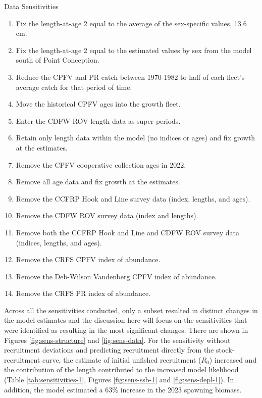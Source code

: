\documentclass[11pt,
  english,
  letterpaper,
]{article}
\begin{document}
Data Sensitivities

\begin{enumerate}

  \item Fix the length-at-age 2 equal to the average of the sex-specific values, 13.6 cm.
  
  \item Fix the length-at-age 2 equal to the estimated values by sex from the model south of Point Conception.
   
  \item Reduce the CPFV and PR catch between 1970-1982 to half of each fleet's average catch for that period of time.
  
  \item Move the historical CPFV ages into the growth fleet.
  
  \item Enter the CDFW ROV length data as super periods.
  
  \item Retain only length data within the model (no indices or ages) and fix growth at the estimates.
  
  \item Remove the CPFV cooperative collection ages in 2022.
  
  \item Remove all age data and fix growth at the estimates.
  
  \item Remove the CCFRP Hook and Line survey data (index, lengths, and ages).
  
  \item Remove the CDFW ROV survey data (index and lengths).
  
  \item Remove both the CCFRP Hook and Line and CDFW ROV survey data (indices, lengths, and ages).
  
  \item Remove the CRFS CPFV index of abundance.
  
  \item Remove the Deb-Wilson Vandenberg CPFV index of abundance.
  
  \item Remove the CRFS PR index of abundance.
  
\end{enumerate}

Across all the sensitivities conducted, only a subset resulted in distinct changes in the model estimates and the discussion here will focus on the sensitivities that were identified as resulting in the most significant changes. There are shown in Figures \ref{fig:sens-structure} and \ref{fig:sens-data}. For the sensitivity without recruitment deviations and predicting recruitment directly from the stock-recruitment curve, the estimate of initial unfished recruitment (\(R_0\)) increased and the contribution of the length contributed to the increased model likelihood (Table \ref{tab:sensitivities-1}, Figures \ref{fig:sens-ssb-1} and \ref{fig:sens-depl-1}). In addition, the model estimated a 63\% increase in the 2023 spawning biomass.
\end{document}
